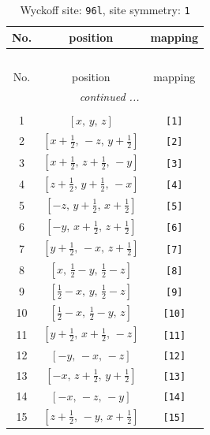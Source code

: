 \documentclass[fleqn,8pt]{jsarticle}
\begin{document}
\begin{longtable}{ccc}
\caption{Wyckoff site: {\tt 96l}, site symmetry: {\tt 1}}
 \\
 \hline \hline
No. & position & mapping \\ \hline \endfirsthead

\multicolumn{2}{l}{\tablename\ \thetable{}} \\
 \hline \hline
No. & position & mapping \\ \hline \endhead

 \hline \hline
\multicolumn{2}{r}{\footnotesize\it continued ...} \\ \endfoot

 \hline \hline
\multicolumn{2}{r}{} \\ \endlastfoot

1 & $\left[ x,\, y,\, z \right]$ & {\tt [1]} \\ \hline
2 & $\left[ x + \frac{1}{2},\, - z,\, y + \frac{1}{2} \right]$ & {\tt [2]} \\ \hline
3 & $\left[ x + \frac{1}{2},\, z + \frac{1}{2},\, - y \right]$ & {\tt [3]} \\ \hline
4 & $\left[ z + \frac{1}{2},\, y + \frac{1}{2},\, - x \right]$ & {\tt [4]} \\ \hline
5 & $\left[ - z,\, y + \frac{1}{2},\, x + \frac{1}{2} \right]$ & {\tt [5]} \\ \hline
6 & $\left[ - y,\, x + \frac{1}{2},\, z + \frac{1}{2} \right]$ & {\tt [6]} \\ \hline
7 & $\left[ y + \frac{1}{2},\, - x,\, z + \frac{1}{2} \right]$ & {\tt [7]} \\ \hline
8 & $\left[ x,\, \frac{1}{2} - y,\, \frac{1}{2} - z \right]$ & {\tt [8]} \\ \hline
9 & $\left[ \frac{1}{2} - x,\, y,\, \frac{1}{2} - z \right]$ & {\tt [9]} \\ \hline
10 & $\left[ \frac{1}{2} - x,\, \frac{1}{2} - y,\, z \right]$ & {\tt [10]} \\ \hline
11 & $\left[ y + \frac{1}{2},\, x + \frac{1}{2},\, - z \right]$ & {\tt [11]} \\ \hline
12 & $\left[ - y,\, - x,\, - z \right]$ & {\tt [12]} \\ \hline
13 & $\left[ - x,\, z + \frac{1}{2},\, y + \frac{1}{2} \right]$ & {\tt [13]} \\ \hline
14 & $\left[ - x,\, - z,\, - y \right]$ & {\tt [14]} \\ \hline
15 & $\left[ z + \frac{1}{2},\, - y,\, x + \frac{1}{2} \right]$ & {\tt [15]} \\ \hline

\end{longtable}
\end{document}
